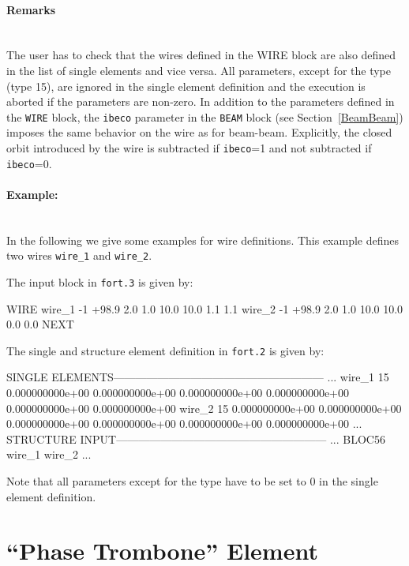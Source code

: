 \paragraph{Remarks}~\\

The user has to check that the wires defined in the WIRE block are also defined in the list of single elements and vice versa.
All parameters, except for the type (type 15), are ignored in the single element definition and the execution is aborted if the parameters are non-zero.
In addition to the parameters defined in the \texttt{WIRE} block, the \texttt{ibeco} parameter in the \texttt{BEAM} block (see Section~\ref{BeamBeam}) imposes the same behavior on the wire as for beam-beam.
Explicitly, the closed orbit introduced by the wire is subtracted if \texttt{ibeco}=1 and not subtracted if \texttt{ibeco}=0.

\paragraph{Example:}~\\

In the following we give some examples for wire definitions.
This example defines two wires \texttt{wire\_1} and \texttt{wire\_2}.

The input block in \texttt{fort.3} is given by:
\begin{cverbatim}
WIRE
wire_1   -1  +98.9   2.0  1.0   10.0   10.0     1.1     1.1
wire_2   -1  +98.9   2.0  1.0   10.0   10.0     0.0     0.0
NEXT
\end{cverbatim}
The single and structure element definition in \texttt{fort.2} is given by:
\begin{ctverbatim}
SINGLE ELEMENTS---------------------------------------------------------
...
wire_1   15 0.000000000e+00 0.000000000e+00  0.000000000e+00  0.000000000e+00  0.000000000e+00  0.000000000e+00
wire_2   15 0.000000000e+00 0.000000000e+00  0.000000000e+00  0.000000000e+00  0.000000000e+00  0.000000000e+00
...
STRUCTURE INPUT---------------------------------------------------------
...
BLOC56            wire_1              wire_2
...
\end{ctverbatim}
Note that all parameters except for the type have to be set to 0 in the single element definition.

\section{``Phase Trombone'' Element} \label{Trombone}

